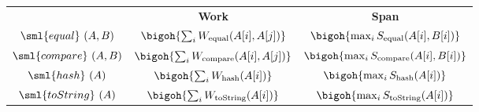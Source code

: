 \begin{cluster}
\label{grp:cost:sequence}

\begin{costspec}[MkSeqElt]
\label{cost:sequence}
\begin{tabular}{c|c|c}
& \textbf{Work} & \textbf{Span} \\
$\sml{equal}~(A,B)$ & $\bigoh{\sum_i W_{\text{equal}}(A[i], A[j])}$ & $\bigoh {\max_i S_{\text{equal}} (A[i], B[i])}$ \\
$\sml{compare}~(A,B)$ & $\bigoh{\sum_i W_{\text{compare}}(A[i], A[j])}$ & $\bigoh {\max_i S_{\text{compare}} (A[i], B[i])}$ \\
$\sml{hash}~(A)$ & $\bigoh{\sum_i W_{\text{hash}}(A[i])}$ & $\bigoh {\max_i S_{\text{hash}} (A[i])}$ \\
$\sml{toString}~(A)$ & $\bigoh{\sum_i W_{\text{toString}}(A[i])}$ & $\bigoh {\max_i S_{\text{toString}} (A[i])}$ \\
\end{tabular}

\end{costspec}
\end{cluster}

